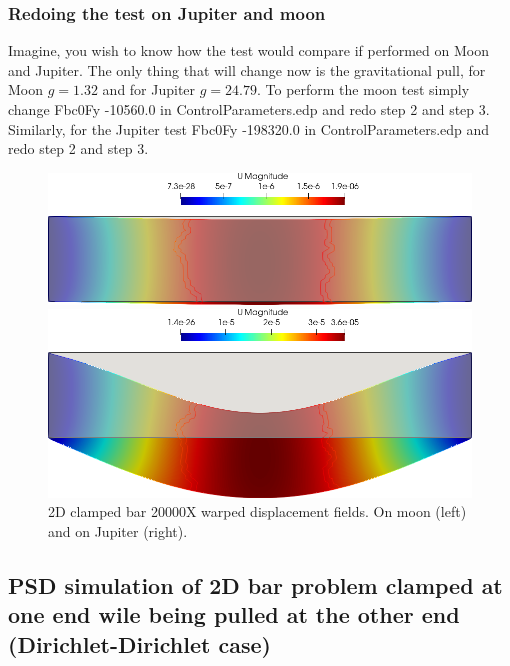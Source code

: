 {{\subsubsection{Redoing the test on Jupiter and moon}

Imagine, you wish to know how the test would compare if performed on Moon and Jupiter. The only thing that will change now is the gravitational pull, for Moon $g=1.32$ and for Jupiter $g=24.79$. To perform the moon test simply change  {\ttfamily Fbc0Fy -10560.0} in {\ttfamily ControlParameters.edp} and redo step 2 and step 3. Similarly, for the Jupiter test {\ttfamily Fbc0Fy -198320.0} in {\ttfamily ControlParameters.edp} and redo step 2 and step 3.

\begin{figure}[htbp]
    \centering
    \begin{minipage}[t][2.5cm][t]{0.4\textwidth}
    \includegraphics[align=t,width=1\textwidth]{./Images/2d-bar-moon.png}
    \end{minipage}\hspace{.1\textwidth}
    \begin{minipage}[t][2.5cm][t]{0.4\textwidth}
    \includegraphics[align=t,width=1\textwidth]{./Images/2d-bar-Jupiter.png}
    \end{minipage}
    \caption{2D clamped bar 20000X warped displacement fields. On moon (left) and  on Jupiter (right).}
    \label{fig:moon-jupiter}
\end{figure}

\subsection{PSD simulation of 2D bar problem clamped at one end wile being pulled at the other end (Dirichlet-Dirichlet case)\label{sec:2d-bar-clamped2}}

}}
